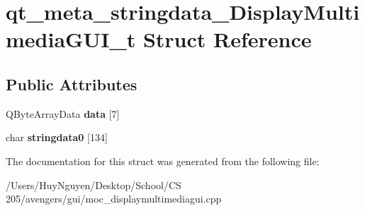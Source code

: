 \hypertarget{structqt__meta__stringdata__DisplayMultimediaGUI__t}{}\section{qt\+\_\+meta\+\_\+stringdata\+\_\+\+Display\+Multimedia\+G\+U\+I\+\_\+t Struct Reference}
\label{structqt__meta__stringdata__DisplayMultimediaGUI__t}
\subsection*{Public Attributes}
\begin{DoxyCompactItemize}
\item 
Q\+Byte\+Array\+Data {\bfseries data} \mbox{[}7\mbox{]}\hypertarget{structqt__meta__stringdata__DisplayMultimediaGUI__t_ad4bc002601ddc405f1ae2f7a81e4a293}{}\label{structqt__meta__stringdata__DisplayMultimediaGUI__t_ad4bc002601ddc405f1ae2f7a81e4a293}

\item 
char {\bfseries stringdata0} \mbox{[}134\mbox{]}\hypertarget{structqt__meta__stringdata__DisplayMultimediaGUI__t_a14b38b4962a5c0b1347b0ea3d708cccb}{}\label{structqt__meta__stringdata__DisplayMultimediaGUI__t_a14b38b4962a5c0b1347b0ea3d708cccb}

\end{DoxyCompactItemize}


The documentation for this struct was generated from the following file\+:\begin{DoxyCompactItemize}
\item 
/\+Users/\+Huy\+Nguyen/\+Desktop/\+School/\+C\+S 205/avengers/gui/moc\+\_\+displaymultimediagui.\+cpp\end{DoxyCompactItemize}
